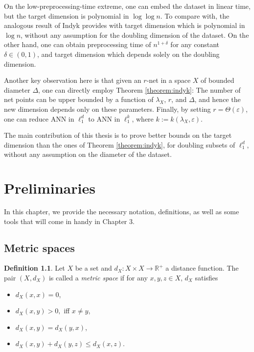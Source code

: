 \documentclass[10pt,a4paper,twoside]{book}
\newcommand{\eps}{\varepsilon}
\theoremstyle{definition}
\newtheorem{definition}{Definition}[chapter]
\theoremstyle{remark}
\begin{document}
On the low-preprocessing-time extreme, one can embed the dataset in linear time, but the target dimension is polynomial in $\log \log n$. To compare with, the analogous result of Indyk \cite{Ind06} provides with target dimension which is polynomial in $\log n$, without any assumption for the doubling dimension of the dataset. On the other hand, one can obtain preprocessing time of $n^{1+\delta}$ for any constant $\delta \in (0,1)$, and target dimension which depends solely on the doubling dimension.

Another key observation here is that given an $r$-net in a space $X$ of bounded diameter $\Delta$, one can directly employ Theorem \ref{theorem:indyk}: The number of net points can be upper bounded by a function of $\lambda_X$, $r$, and $\Delta$, and hence the new dimension depends only on these parameters. Finally, by setting $r=\Theta(\eps)$, one can reduce ANN in $\ell_1^d$ to ANN in $\ell_1^k$, where $k:=k(\lambda_X,\eps)$.

The main contribution of this thesis is to prove better bounds on the target dimension than the ones of Theorem \ref{theorem:indyk}, for doubling subsets of $\ell_1^d$, without any assumption on the diameter of the dataset.
\fi
\clearpage
\thispagestyle{empty}
\chapter{Preliminaries}
In this chapter, we provide the necessary notation, definitions, as well as some tools that will come in handy in Chapter 3.
\section{Metric spaces}

\begin{definition}
Let $X$ be a set and $d_X: X{\times}X \rightarrow \mathbb{R}^+$ a distance function. The pair $(X,d_X)$ is called a \textit{metric space} if for any $x,y,z \in X$, $d_X$ satisfies
\begin{itemize} \itemsep0em
    \item $d_X(x,x) = 0$,
    \item $d_X(x,y) > 0,$ iff $x \neq y$,
    \item $d_X(x,y) = d_X(y,x)$,
    \item $d_X(x,y) + d_X(y,z) \leq d_X(x,z)$.
\end{itemize}
\end{definition}
\end{document}
